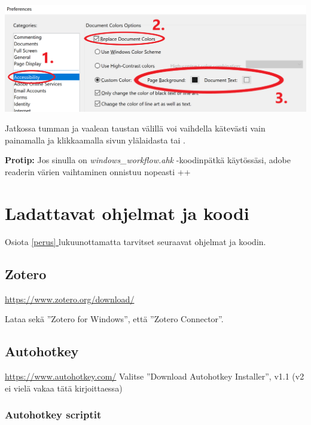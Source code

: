 \documentclass[a4paper,12pt]{scrartcl}
\newcommand*{\fullref}[1]{\hyperref[{#1}]{\ref*{#1} \nameref*{#1}}} %
\begin{document}
\includegraphics[width=\textwidth]{img/adobe_reader}

Jatkossa tumman ja vaalean taustan välillä voi vaihdella kätevästi vain painamalla ja klikkaamalla sivun ylälaidasta  tai .

\textbf{Protip:} Jos sinulla on \emph{windows\_workflow.ahk} -koodinpätkä käytössäsi, adobe readerin värien vaihtaminen onnistuu nopeasti ++

\pagebreak \section{Ladattavat ohjelmat ja koodi}
Osiota \fullref{perus} lukuunottamatta tarvitset seuraavat ohjelmat ja koodin.





\subsection{Zotero}
\url{https://www.zotero.org/download/}


Lataa sekä ''Zotero for Windows'', että ''Zotero Connector''. 

\subsection{Autohotkey}
\url{https://www.autohotkey.com/}
Valitse ''Download Autohotkey Installer'', v1.1 (v2 ei vielä vakaa tätä kirjoittaessa)

\subsubsection{Autohotkey scriptit} \label{downloads}
\end{document}
